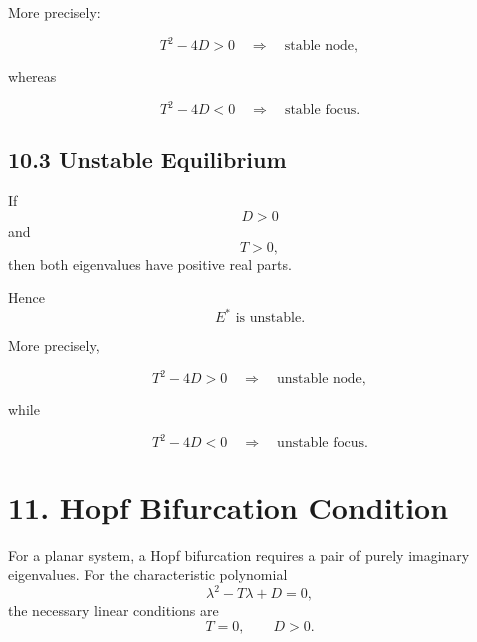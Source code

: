 \documentclass[11pt,a4paper]{article}
\begin{document}
More precisely:

\begin{equation}
T^2-4D>0
\quad\Longrightarrow\quad
\text{stable node},
\end{equation}

whereas

\begin{equation}
T^2-4D<0
\quad\Longrightarrow\quad
\text{stable focus}.
\end{equation}

\subsection*{10.3 Unstable Equilibrium}

If
\begin{equation}
D>0
\end{equation}
and
\begin{equation}
T>0,
\end{equation}
then both eigenvalues have positive real parts.

Hence
\begin{equation}
\boxed{
E^*\text{ is unstable}.
}
\tag{39}
\end{equation}

More precisely,

\begin{equation}
T^2-4D>0
\quad\Longrightarrow\quad
\text{unstable node},
\end{equation}

while

\begin{equation}
T^2-4D<0
\quad\Longrightarrow\quad
\text{unstable focus}.
\end{equation}

\section{11. Hopf Bifurcation Condition}

For a planar system, a Hopf bifurcation requires a pair of purely
imaginary eigenvalues. For the characteristic polynomial
\begin{equation}
\lambda^2-T\lambda+D=0,
\end{equation}
the necessary linear conditions are
\begin{equation}
\boxed{
T=0,
\qquad
D>0.
}
\tag{40}
\end{equation}
\end{document}
